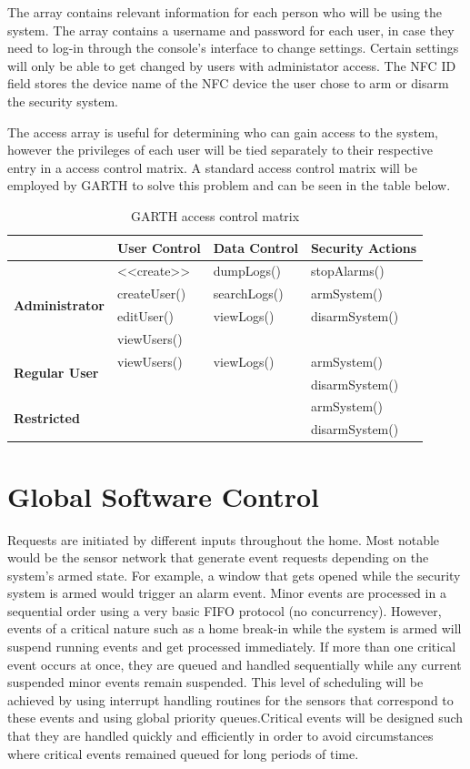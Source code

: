 \documentclass{report}
\begin{document}
The array contains relevant information for each person who will be using the
system. The array contains a username and password for each user, in case
they need to log-in through the console's interface to change settings. Certain
settings will only be able to get changed by users with administator access.
The NFC ID field stores the device name of the NFC device the user chose to arm
or disarm the security system.

The access array is useful for determining who can gain access to the system,
however the privileges of each user will be tied separately to their respective
entry in a access control matrix. A standard access control matrix will be
employed by GARTH to solve this problem and can be seen in the table below.

\begin{table}[h]
    \caption{GARTH access control matrix}
    \label{access_control}
    \centering
    \begin{tabular}{| l | l | l | l |}
    \hline
    &\textbf{User Control}&\textbf{Data Control}&\textbf{Security Actions} \\ \hline
    \multirow{4}{*}{\textbf{Administrator}}&
    \textless\textless create\textgreater\textgreater&dumpLogs()&stopAlarms() \\
    &createUser()&searchLogs()&armSystem() \\ 
    &editUser()&viewLogs()&disarmSystem() \\
    &viewUsers()&& \\ \hline
    \multirow{2}{*}{\textbf{Regular User}}&viewUsers()&viewLogs()&armSystem() \\
    &&&disarmSystem() \\ \hline
    \multirow{2}{*}{\textbf{Restricted}}&&&armSystem() \\
    &&&disarmSystem() \\
    \hline
    \end{tabular}
\end{table}

\section{Global Software Control}

Requests are initiated by different inputs throughout the home. Most notable
would be the sensor network that generate event requests depending on the
system's armed state. For example, a window that gets opened while the security
system is armed would trigger an alarm event. Minor events are processed in a
sequential order using a very basic FIFO protocol (no concurrency). However,
events of a critical nature such as a home break-in while the system is armed
will suspend running events and get processed immediately. If more than one
critical event occurs at once, they are queued and handled sequentially while
any current suspended minor events remain suspended. This level of scheduling
will be achieved by using interrupt handling routines for the sensors that
correspond to these events and using global priority queues.Critical events
will be designed such that they are handled quickly and efficiently in order to
avoid circumstances where critical events remained queued for long periods of
time.
\end{document}
